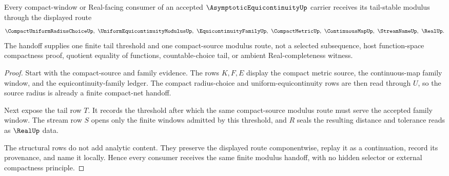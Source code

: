 \begin{theorem}
\label{thm:asymptotic-equicontinuity-modulus-handoff}
Every compact-window or Real-facing consumer of an accepted $\AsymptoticEquicontinuityUp$ carrier receives its tail-stable modulus through the displayed route
$$
\CompactUniformRadiusChoiceUp,\ \UniformEquicontinuityModulusUp,\ \EquicontinuityFamilyUp,\ \CompactMetricUp,\ \ContinuousMapUp,\ \StreamNameUp,\ \RealUp .
$$
The handoff supplies one finite tail threshold and one compact-source modulus route, not a selected subsequence, host function-space compactness proof, quotient equality of functions, countable-choice tail, or ambient Real-completeness witness.
\end{theorem}
\begin{proof}
Start with the compact-source and family evidence. The rows $K,F,E$ display the compact metric source, the continuous-map family window, and the equicontinuity-family ledger. The compact radius-choice and uniform-equicontinuity rows are then read through $U$, so the source radius is already a finite compact-net handoff.

Next expose the tail row $T$. It records the threshold after which the same compact-source modulus route must serve the accepted family window. The stream row $S$ opens only the finite windows admitted by this threshold, and $R$ seals the resulting distance and tolerance reads as $\RealUp$ data.

The structural rows do not add analytic content. They preserve the displayed route componentwise, replay it as a continuation, record its provenance, and name it locally. Hence every consumer receives the same finite modulus handoff, with no hidden selector or external compactness principle.
\end{proof}



